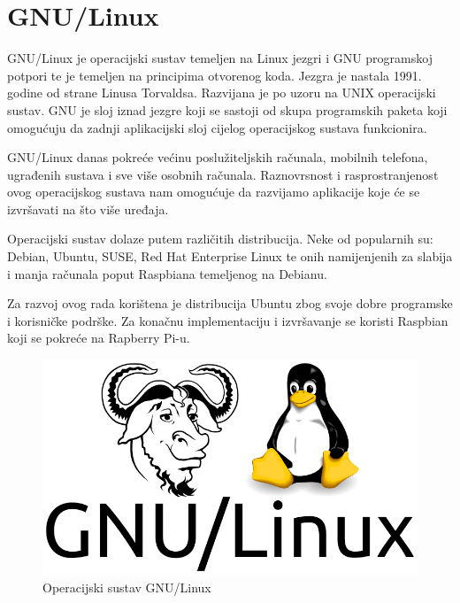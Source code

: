 \documentclass[times, utf8, zavrsni]{fer}
\begin{document}
\section{GNU/Linux}	
GNU/Linux je operacijski sustav temeljen na Linux jezgri i GNU programskoj potpori te je temeljen na principima otvorenog koda. Jezgra je nastala 1991. godine od strane Linusa Torvaldsa. Razvijana je po uzoru na UNIX operacijski sustav. GNU je sloj iznad jezgre koji se sastoji od skupa programskih paketa koji omogućuju da zadnji aplikacijski sloj cijelog operacijskog sustava funkcionira. \par 
GNU/Linux danas pokreće većinu poslužiteljskih računala, mobilnih telefona, ugrađenih sustava i sve više osobnih računala. Raznovrsnost i rasprostranjenost ovog operacijskog sustava nam omogućuje da razvijamo aplikacije koje će se izvršavati na što više uređaja.\par
Operacijski sustav dolaze putem različitih distribucija. Neke od popularnih su: Debian, Ubuntu, SUSE, Red Hat Enterprise Linux te onih namijenjenih za slabija i manja računala poput Raspbiana temeljenog na Debianu.\par 
Za razvoj ovog rada korištena je distribucija Ubuntu zbog svoje dobre programske i korisničke podrške. Za konačnu implementaciju i izvršavanje se koristi Raspbian koji se pokreće na Rapberry Pi-u.

\begin{figure}[h]
\includegraphics[scale=0.3]{gnulinux.png}
\centering
\caption{Operacijski sustav GNU/Linux}
\centering
\end{figure}
\end{document}
